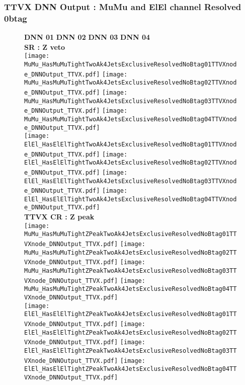 \documentclass[9pt]{beamer}
\begin{document}
\begin{frame}
	\frametitle{TTVX DNN Output : MuMu and ElEl channel Resolved 0btag}
	\begin{figure}
	    \textbf{DNN 01} \hspace{1.2cm} \textbf{DNN 02} \hspace{1.2cm} \textbf{DNN 03} \hspace{1.2cm} \textbf{DNN 04} \\
        \centering
        \textbf{SR : Z veto} \\
		\texttt{[image: MuMu\_HasMuMuTightTwoAk4JetsExclusiveResolvedNoBtag01TTVXnode\_DNNOutput\_TTVX.pdf]}
		\texttt{[image: MuMu\_HasMuMuTightTwoAk4JetsExclusiveResolvedNoBtag02TTVXnode\_DNNOutput\_TTVX.pdf]}
		\texttt{[image: MuMu\_HasMuMuTightTwoAk4JetsExclusiveResolvedNoBtag03TTVXnode\_DNNOutput\_TTVX.pdf]}
		\texttt{[image: MuMu\_HasMuMuTightTwoAk4JetsExclusiveResolvedNoBtag04TTVXnode\_DNNOutput\_TTVX.pdf]}\\
		\texttt{[image: ElEl\_HasElElTightTwoAk4JetsExclusiveResolvedNoBtag01TTVXnode\_DNNOutput\_TTVX.pdf]}
		\texttt{[image: ElEl\_HasElElTightTwoAk4JetsExclusiveResolvedNoBtag02TTVXnode\_DNNOutput\_TTVX.pdf]}
		\texttt{[image: ElEl\_HasElElTightTwoAk4JetsExclusiveResolvedNoBtag03TTVXnode\_DNNOutput\_TTVX.pdf]}
		\texttt{[image: ElEl\_HasElElTightTwoAk4JetsExclusiveResolvedNoBtag04TTVXnode\_DNNOutput\_TTVX.pdf]}\\
        \textbf{TTVX CR : Z peak} \\
		\texttt{[image: MuMu\_HasMuMuTightZPeakTwoAk4JetsExclusiveResolvedNoBtag01TTVXnode\_DNNOutput\_TTVX.pdf]}
		\texttt{[image: MuMu\_HasMuMuTightZPeakTwoAk4JetsExclusiveResolvedNoBtag02TTVXnode\_DNNOutput\_TTVX.pdf]}
		\texttt{[image: MuMu\_HasMuMuTightZPeakTwoAk4JetsExclusiveResolvedNoBtag03TTVXnode\_DNNOutput\_TTVX.pdf]}
		\texttt{[image: MuMu\_HasMuMuTightZPeakTwoAk4JetsExclusiveResolvedNoBtag04TTVXnode\_DNNOutput\_TTVX.pdf]}\\
		\texttt{[image: ElEl\_HasElElTightZPeakTwoAk4JetsExclusiveResolvedNoBtag01TTVXnode\_DNNOutput\_TTVX.pdf]}
		\texttt{[image: ElEl\_HasElElTightZPeakTwoAk4JetsExclusiveResolvedNoBtag02TTVXnode\_DNNOutput\_TTVX.pdf]}
		\texttt{[image: ElEl\_HasElElTightZPeakTwoAk4JetsExclusiveResolvedNoBtag03TTVXnode\_DNNOutput\_TTVX.pdf]}
		\texttt{[image: ElEl\_HasElElTightZPeakTwoAk4JetsExclusiveResolvedNoBtag04TTVXnode\_DNNOutput\_TTVX.pdf]}\\
	\end{figure}
\end{frame}
\end{document}
